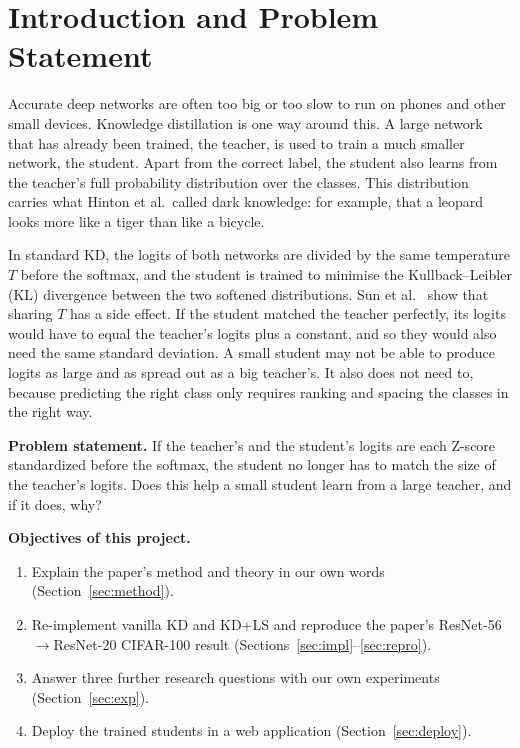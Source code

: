 \documentclass[12pt,a4paper]{article}
\begin{document}
\section{Introduction and Problem Statement}

Accurate deep networks are often too big or too slow to run on phones and other small devices. Knowledge distillation \cite{hinton2015} is one way around this. A large network that has already been trained, the teacher, is used to train a much smaller network, the student. Apart from the correct label, the student also learns from the teacher's full probability distribution over the classes. This distribution carries what Hinton et al.\ called dark knowledge: for example, that a leopard looks more like a tiger than like a bicycle.

In standard KD, the logits of both networks are divided by the same temperature $T$ before the softmax, and the student is trained to minimise the Kullback--Leibler (KL) divergence between the two softened distributions. Sun et al.\ \cite{sun2024} show that sharing $T$ has a side effect. If the student matched the teacher perfectly, its logits would have to equal the teacher's logits plus a constant, and so they would also need the same standard deviation. A small student may not be able to produce logits as large and as spread out as a big teacher's. It also does not need to, because predicting the right class only requires ranking and spacing the classes in the right way.

\textbf{Problem statement.} If the teacher's and the student's logits are each Z-score standardized before the softmax, the student no longer has to match the size of the teacher's logits. Does this help a small student learn from a large teacher, and if it does, why?

\textbf{Objectives of this project.}
\begin{enumerate}[nosep]
    \item Explain the paper's method and theory in our own words (Section~\ref{sec:method}).
    \item Re-implement vanilla KD and KD+LS and reproduce the paper's ResNet-56$\rightarrow$ResNet-20 CIFAR-100 result (Sections~\ref{sec:impl}--\ref{sec:repro}).
    \item Answer three further research questions with our own experiments (Section~\ref{sec:exp}).
    \item Deploy the trained students in a web application (Section~\ref{sec:deploy}).
\end{enumerate}
\end{document}
